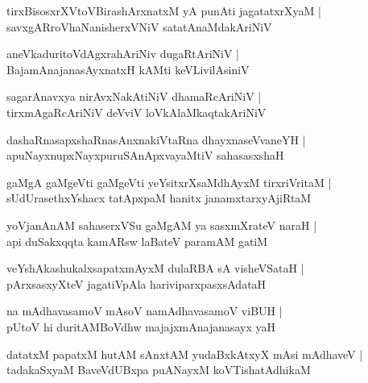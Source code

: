\documentclass[twoside,12pt,openright]{book}
\newcounter{shloka}[chapter]
\begin{document}
\begin{shloka}%
tirxBisosxrXVtoVBirashArxnatxM yA punAti jagatatxrXyaM |\\
savxgARroVhaNanisherxVNiV satatAnaMdakAriNiV 
\end{shloka}

\begin{shloka}%
aneVkaduritoVdAgxrahAriNiv dugaRtAriNiV |\\
BajamAnajanasAyxnatxH kAMti keVLivilAsiniV 
\end{shloka}

\begin{shloka}%
sagarAnavxya nirAvxNakAtiNiV dhamaRcAriNiV |\\
tirxmAgaRcAriNiV deVviV loVkAlaMkaqtakAriNiV 
\end{shloka}

\begin{shloka}%
dashaRnasapxshaRnasAnxnakiVtaRna dhayxnaseVvaneYH |\\
apuNayxnupxNayxpuruSAnApxvayaMtiV sahasasxshaH 
\end{shloka}

\begin{shloka}%
gaMgA gaMgeVti gaMgeVti yeYsitxrXsaMdhAyxM tirxriVritaM |\\
sUdUrasethxYshacx tatApxpaM hanitx janamxtarxyAjiRtaM 
\end{shloka}

\begin{shloka}%
yoVjanAnAM sahaserxVSu gaMgAM ya sasxmXrateV naraH |\\
api duSakxqqta kamARsw laBateV paramAM gatiM 
\end{shloka}

\begin{shloka}%
veYshAkashukalxsapatxmAyxM dulaRBA sA visheVSataH |\\
pArxsasxyXteV jagatiVpAla hariviparxpasxsAdataH 
\end{shloka}

\begin{shloka}%
na mAdhavasamoV mAsoV namAdhavasamoV viBUH |\\
pUtoV hi duritAMBoVdhw majajxmAnajanasayx yaH 
\end{shloka}

\begin{shloka}%
datatxM papatxM hutAM sAnxtAM yudaBxkAtxyX mAsi mAdhaveV |\\
tadakaSxyaM BaveVdUBxpa puANayxM koVTishatAdhikaM 
\end{shloka}
\end{document}
